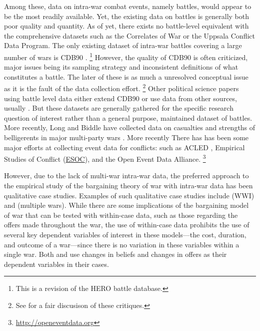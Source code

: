 Among these, data on intra-war combat events, namely battles, would appear to be the most readily available.
Yet, the existing data on battles is generally both poor quality and quantity.
As of yet, there exists no battle-level equivalent with the comprehensive datasets such as the Correlates of War \parencite{SarkeesWayman2010} or the Uppsala Conflict Data Program.
The only existing dataset of intra-war battles covering a large number of wars is CDB90 \parencite{cdb90}.%
\footnote{This is a revision of the HERO battle database.}
However, the quality of CDB90 is often criticized, major issues being its sampling strategy and inconsistent definitions of what constitutes a battle.
The later of these is as much a unresolved conceptual issue as it is the fault of the data collection effort.%
\footnote{See \textcite{BiddleLong2004} for a fair discusison of these critiques.}
Other political science papers using battle level data either extend CDB90 or use data from other sources, usually \textcite{Clodfelter2008}.
But these datasets are generally gathered for the specific research question of interest rather than a general purpose, maintained dataset of battles.
More recently, Long and Biddle have collected data on casualties and strengths of belligerents in major multi-party wars \parencite{CochranLong2014}.
More recently There has has been some major efforts at collecting event data for conflicts:
such as ACLED \parencites{RaleighLinkeHegreEtAl2010}, Empirical Studies of Conflict (\href{http://esoc.princeton.edu/}{ESOC}), and the Open Event Data Alliance.%
\footnote{\url{http://openeventdata.org}}

However, due to the lack of multi-war intra-war data, the preferred approach to the empirical study of the bargaining theory of war with intra-war data has been qualitative case studies\parencites{Reiter2003}[][Chapter 9]{Reiter2009}.
Examples of such qualitative case studies include  \textcite{Goemans2000} (WWI) and \textcite{Reiter2009} (multiple wars).
While there are some implications of the bargaining model of war that can be tested with within-case data, such as those regarding the offers made throughout the war, the use of within-case data prohibits the use of several key dependent variables of interest in these models---the cost, duration, and outcome of a war---since there is no variation in these variables within a single war.
Both \textcite{Reiter2009} and \textcite{Goemans2000} use changes in beliefs and changes in offers as their dependent variables in their cases.

